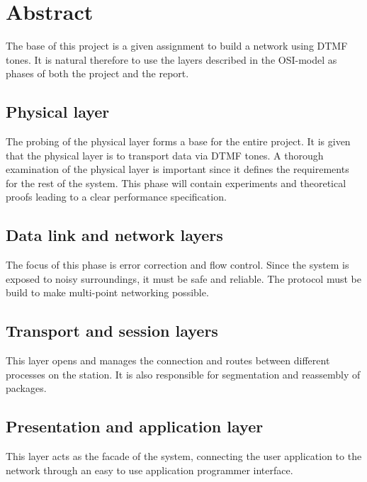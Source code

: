 \chapter*{Abstract}
The base of this project is a given assignment to build a network using DTMF
tones. It is natural therefore to use the layers described in the OSI-model as
phases of both the project and the report.

\section*{Physical layer}
The probing of the physical layer forms a base for the entire project. It is
given that the physical layer is to transport data via DTMF tones. A thorough
examination of the physical layer is important since it defines the requirements
for the rest of the system. This phase will contain experiments and theoretical
proofs leading to a clear performance specification.

\section*{Data link and network layers}
The focus of this phase is error correction and flow control. Since the system
is exposed to noisy surroundings, it must be safe and reliable. The protocol
must be build to make multi-point networking possible.

\section*{Transport and session layers}
This layer opens and manages the connection and routes between different
processes on the station. It is also responsible for segmentation and reassembly
of packages.

\section*{Presentation and application layer}
This layer acts as the facade of the system, connecting the user application to
the network through an easy to use application programmer interface.
